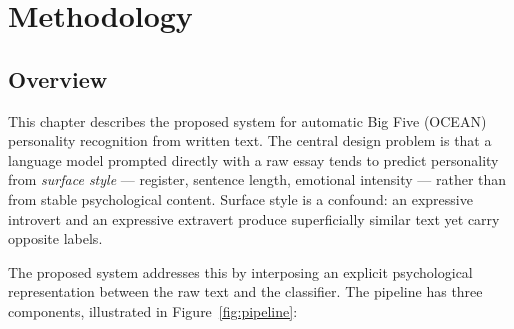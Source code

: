 \documentclass[../main.tex]{subfiles}
\begin{document}
\newcommand{\figplaceholder}[2][0.85\textwidth]{%
  \begin{tikzpicture}
    \draw[thick, dashed, fill=gray!8]
      (0,0) rectangle (#1,0.42\textwidth);
    \node[align=center, text width=\dimexpr#1-1cm\relax]
      at (\dimexpr#1/2\relax,0.21\textwidth)
      {\textbf{[FIGURE PLACEHOLDER]}\\[4pt]\itshape #2};
  \end{tikzpicture}%
}



\chapter{Methodology}
\label{chap:methodology}

\section{Overview}
\label{sec:overview}

This chapter describes the proposed system for automatic Big Five (OCEAN)
personality recognition from written text. The central design problem is that a
language model prompted directly with a raw essay tends to predict personality
from \emph{surface style} --- register, sentence length, emotional intensity ---
rather than from stable psychological content. Surface style is a confound: an
expressive introvert and an expressive extravert produce superficially similar
text yet carry opposite labels.

The proposed system addresses this by interposing an explicit psychological
representation between the raw text and the classifier. The pipeline has three
components, illustrated in Figure~\ref{fig:pipeline}:
\end{document}
